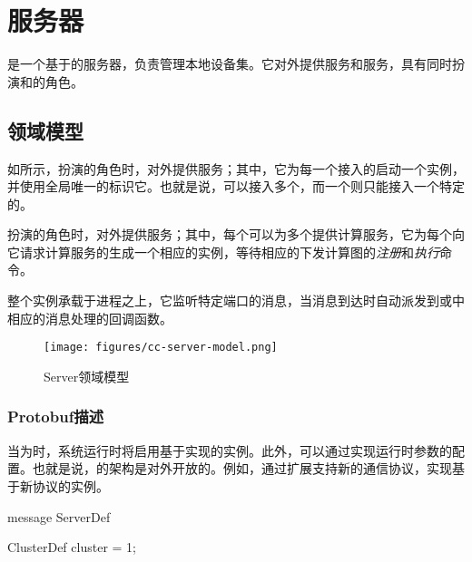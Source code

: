 \section{服务器}

\begin{content}

是一个基于的服务器，负责管理本地设备集。它对外提供服务和服务，具有同时扮演和的角色。

\subsection{领域模型}

如所示，扮演的角色时，对外提供服务；其中，它为每一个接入的启动一个实例，并使用全局唯一的标识它。也就是说，可以接入多个，而一个则只能接入一个特定的。

扮演的角色时，对外提供服务；其中，每个可以为多个提供计算服务，它为每个向它请求计算服务的生成一个相应的实例，等待相应的下发计算图的\emph{注册}和\emph{执行}命令。

整个实例承载于进程之上，它监听特定端口的消息，当消息到达时自动派发到或中相应的消息处理的回调函数。

\begin{figure}[H]
\centering
\texttt{[image: figures/cc-server-model.png]}
\caption{Server领域模型}
 \label{fig:cc-server-model}
\end{figure}

\subsubsection{Protobuf描述}

当为时，系统运行时将启用基于实现的实例。此外，可以通过实现运行时参数的配置。也就是说，\tf{}的架构是对外开放的。例如，通过扩展支持新的通信协议，实现基于新协议的实例。

\begin{leftbar}
\begin{python}
message ServerDef {
  ClusterDef cluster = 1;
  
}
\end{python}
\end{leftbar}
\end{content}
